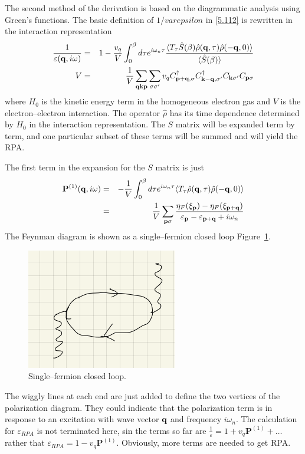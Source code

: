 The second method of the derivation is based on the diagrammatic analysis using Green's functions.
The basic definition of $1/varepsilon$ in \eqref{5.112} is rewritten in the interaction representation
\begin{eqnarray}
    \frac{1}{\varepsilon(\mathbf{q},i\omega)}  & = & 1 - \frac{v_q}{V} \int_0^\beta d\tau e^{i\omega_n \tau} \frac{\langle T_\tau \hat{S}(\beta) \hat{\rho}(\mathbf{q},\tau) \hat{\rho}(-\mathbf{q},0)\rangle}{\langle \hat{S}(\beta) \rangle} \label{5.153} \\
    V & = & \frac{1}{V} \sum_{\mathbf{q}\mathbf{k}\mathbf{p}}\sum_{\sigma\sigma'} v_q C^\dagger_{\mathbf{p}+\mathbf{q},\sigma} C^\dagger_{\mathbf{k}-\mathbf{q},\sigma'} C_{\mathbf{k}\sigma'} C_{\mathbf{p}\sigma}    \label{5.154}
\end{eqnarray}
where $H_0$ is the kinetic energy term in the homogeneous electron gas and $V$ is the electron--electron interaction.
The operator $\hat{\rho}$ has its time dependence determined by $H_0$ in the interaction representation.
The $S$ matrix will be expanded term by term, and one particular subset of these terms will be summed and will yield the RPA.

The first term in the expansion for the $S$ matrix is just
\begin{eqnarray}
    \mathbf{P}^{(1)}(\mathbf{q},i\omega) & = & - \frac{1}{V} \int_0^\beta d \tau e^{i \omega_n \tau} \langle T_\tau \hat{\rho}(\mathbf{q},\tau) \hat{\rho}(-\mathbf{q},0)\rangle \nonumber \\
    & = & \frac{1}{V} \sum_{\mathbf{p}\sigma} \frac{\eta_F(\xi_{\mathbf{p}}) -\eta_F(\xi_{\mathbf{p}+\mathbf{q}})}{\varepsilon_{\mathbf{p}} - \varepsilon_{\mathbf{p}+\mathbf{q}} + i \omega_n} \label{5.157}
\end{eqnarray}
The Feynman diagram is shown as a single--fermion closed loop Figure~\ref{fig:5.9}.
\begin{figure}[ht]
    \centering
    \includegraphics[width=0.2\linewidth]{fig/fig5-9.png}
    \caption{Single--fermion closed loop.}%
    \label{fig:5.9}
\end{figure}
The wiggly lines at each end are just added to define the two vertices of the polarization diagram.
They could indicate that the polarization term is in response to an excitation with wave vector $\mathbf{q}$ and frequency $i\omega_n$.
The calculation for $\varepsilon_{RPA}$ is not terminated here, sin the terms so far are $ \frac{1}{\varepsilon} = 1 + v_q \mathbf{P}^{(1)} + \dots $ rather that $\varepsilon_{RPA} = 1 - v_q \mathbf{P}^{(1)}$.
Obviously, more terms are needed to get RPA.

